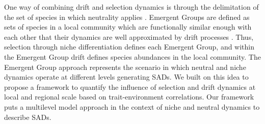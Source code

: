 \documentclass[12pt]{article}
\begin{document}
One way of combining drift and selection dynamics is through the delimitation 
of the set of species in which neutrality applies \citep{Tilman2004, Scheffer2006, Herault2007, Holt2007}. Emergent Groups are defined as sets of species in a local community which are functionally similar enough with each other that their dynamics are well approximated by drift processes \citep{Herault2007}. Thus, selection through niche differentiation defines each Emergent Group, and within the Emergent Group drift defines species abundances in the local community. The Emergent Group approach represents the scenario in which neutral and niche dynamics operate at different levels generating SADs. %
We built on this idea to
propose a framework to quantify the influence of selection and drift dynamics at local and regional scale based on trait-environment correlations. Our framework puts a multilevel model approach \citep{Pollock2012, Jamil2013, Jamil2013a, Miller2019, TerBraak2019} 
in the context of niche and neutral dynamics to describe SADs. 
\end{document}
